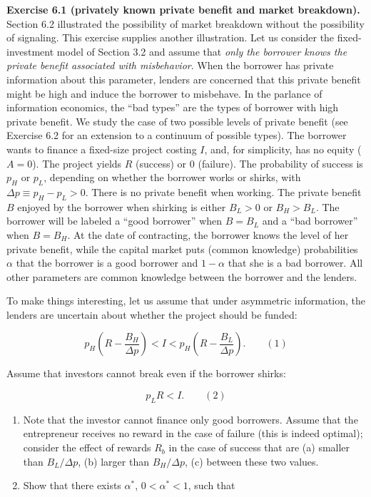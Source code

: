 \documentclass[11pt,a4paper]{article}
\begin{document}
\textbf{Exercise 6.1 (privately known private benefit and market breakdown).} Section 6.2
illustrated the possibility of market breakdown without the possibility of signaling. This exercise
supplies another illustration. Let us consider the fixed-investment model of Section 3.2 and assume
that \emph{only the borrower knows the private benefit associated with misbehavior}. When the
borrower has private information about this parameter, lenders are concerned that this private
benefit might be high and induce the borrower to misbehave. In the parlance of information
economics, the ``bad types'' are the types of borrower with high private benefit. We study the case
of two possible levels of private benefit (see Exercise 6.2 for an extension to a continuum of
possible types). The borrower wants to finance a fixed-size project costing \(I\), and, for
simplicity, has no equity (\(A = 0\)). The project yields \(R\) (success) or 0 (failure). The
probability of success is \(p_H\) or \(p_L\), depending on whether the borrower works or shirks,
with \(\Delta p \equiv p_H - p_L > 0\). There is no private benefit when working. The private
benefit \(B\) enjoyed by the borrower when shirking is either \(B_L > 0\) or \(B_H > B_L\). The
borrower will be labeled a ``good borrower'' when \(B = B_L\) and a ``bad borrower'' when
\(B = B_H\). At the date of contracting, the borrower knows the level of her private benefit, while
the capital market puts (common knowledge) probabilities \(\alpha\) that the borrower is a good
borrower and \(1 - \alpha\) that she is a bad borrower. All other parameters are common knowledge
between the borrower and the lenders.

To make things interesting, let us assume that under asymmetric information, the lenders are
uncertain about whether the project should be funded:

\[p_H\left(R - \frac{B_H}{\Delta p}\right) < I < p_H\left(R - \frac{B_L}{\Delta p}\right). \qquad (1)\]

Assume that investors cannot break even if the borrower shirks:

\[p_L R < I. \qquad (2)\]

\begin{enumerate}
\def\labelenumi{(\roman{enumi})}
\item
  Note that the investor cannot finance only good borrowers. Assume that the entrepreneur receives
  no reward in the case of failure (this is indeed optimal); consider the effect of rewards \(R_b\)
  in the case of success that are (a) smaller than \(B_L/\Delta p\), (b) larger than
  \(B_H/\Delta p\), (c) between these two values.
\item
  Show that there exists \(\alpha^*\), \(0 < \alpha^* < 1\), such that
\end{enumerate}
\end{document}

